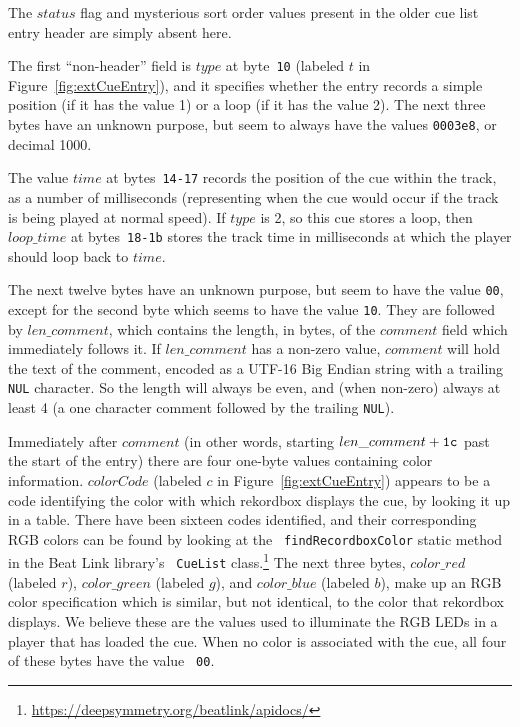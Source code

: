 \documentclass[11pt]{article}
\begin{document}
The $status$ flag and mysterious sort order values present in the
older cue list entry header are simply absent here.

The first ``non-header'' field is $type$ at byte~{\tt 10} (labeled $t$
in Figure~\ref{fig:extCueEntry}), and it specifies whether the entry
records a simple position (if it has the value 1) or a loop (if it has
the value 2). The next three bytes have an unknown purpose, but seem
to always have the values {\tt 0003e8}, or decimal 1000.

The value $time$ at bytes~{\tt 14-17} records the position of the cue
within the track, as a number of milliseconds (representing when the
cue would occur if the track is being played at normal speed). If
$type$ is 2, so this cue stores a loop, then $loop\_time$ at
bytes~{\tt 18-1b} stores the track time in milliseconds at which the
player should loop back to $time$.

The next twelve bytes have an unknown purpose, but seem to have the
value {\tt 00}, except for the second byte which seems to have the
value {\tt 10}. They are followed by $len\_comment$, which contains
the length, in bytes, of the $comment$ field which immediately follows
it. If $len\_comment$ has a non-zero value, $comment$ will hold the
text of the comment, encoded as a UTF-16 Big Endian string with a
trailing {\tt NUL} character. So the length will always be even, and
(when non-zero) always at least 4 (a one character comment followed by
the trailing {\tt NUL}).

Immediately after $comment$ (in other words, starting $len\_comment +
{\tt 1c}$ past the start of the entry) there are four one-byte values
containing color information. $colorCode$ (labeled $c$ in
Figure~\ref{fig:extCueEntry}) appears to be a code identifying the
color with which rekordbox displays the cue, by looking it up in a
table. There have been sixteen codes identified, and their
corresponding RGB colors can be found by looking at the {\tt
  findRecordboxColor} static method in the Beat Link library's {\tt
  CueList}
class.\footnote{\url{https://deepsymmetry.org/beatlink/apidocs/}} The
next three bytes, $color\_red$ (labeled $r$), $color\_green$ (labeled
$g$), and $color\_blue$ (labeled $b$), make up an RGB color
specification which is similar, but not identical, to the color that
rekordbox displays. We believe these are the values used to illuminate
the RGB LEDs in a player that has loaded the cue. When no color is
associated with the cue, all four of these bytes have the value {\tt
  00}.
\end{document}
